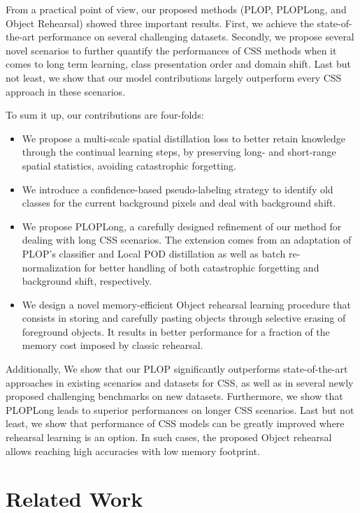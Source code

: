 From a practical point of view, our proposed methods (PLOP, PLOPLong, and Object Rehearsal) showed
three important results. First, we achieve the state-of-the-art performance on several challenging
datasets. Secondly, we propose several novel scenarios to further quantify the performances of \ac{CSS}
methods when it comes to long term learning, class presentation order and domain shift. Last but not
least, we show that our model contributions largely outperform every \ac{CSS} approach in these
scenarios.

To sum it up, our contributions are four-folds:
\begin{itemize}
    \item We propose a multi-scale spatial distillation loss to better retain knowledge through the
          continual learning steps, by preserving long- and short-range spatial statistics, avoiding
          catastrophic forgetting.
    \item We introduce a confidence-based pseudo-labeling strategy to identify old classes for the
          current background pixels and deal with background shift.
    \item We propose PLOPLong, a carefully designed refinement of our method for dealing with long
          \ac{CSS} scenarios. The extension comes from an adaptation of PLOP's classifier and Local POD
          distillation as well as batch re-normalization for better handling of both catastrophic
          forgetting and background shift, respectively.
    \item We design a novel memory-efficient Object rehearsal learning procedure that consists in
          storing and carefully pasting objects through selective erasing of foreground objects. It
          results in better performance for a fraction of the memory cost imposed by classic
          rehearsal.
\end{itemize}

Additionally, We show that our PLOP significantly outperforms state-of-the-art approaches in existing
scenarios and datasets for \ac{CSS}, as well as in several newly proposed challenging benchmarks on new
datasets. Furthermore, we show that PLOPLong leads to superior performances on longer \ac{CSS} scenarios.
Last but not least, we show that performance of \ac{CSS} models can be greatly improved where rehearsal
learning is an option. In such cases, the proposed Object rehearsal allows reaching high accuracies
with low memory footprint.

\section{Related Work}
\label{sec:seg_related}

